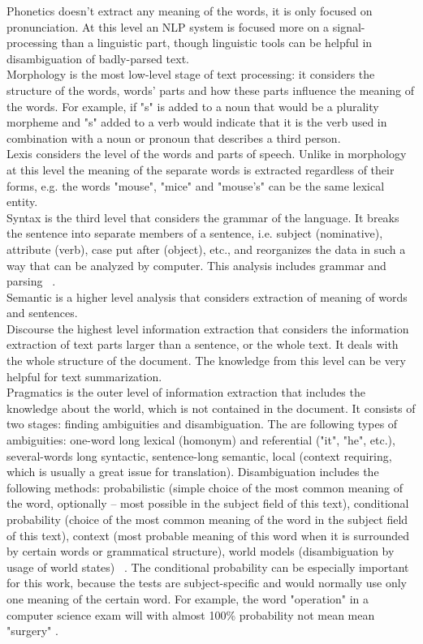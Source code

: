 \documentclass[11pt]{report}
\numberwithin{equation}{section} %
\begin{document}
Phonetics doesn't extract any meaning of the words, it is only focused on pronunciation. At this level an NLP system is focused more on a signal-processing than a linguistic part, though linguistic tools can be helpful in disambiguation of badly-parsed text.\\

Morphology is the most low-level stage of text processing: it considers the structure of the words, words' parts and how these parts influence the meaning of the words. For example, if "s" is added to a noun that would be a plurality morpheme and "s" added to a verb would indicate that it is the verb used in combination with a noun or pronoun that describes a third person.\\

Lexis considers the level of the words and parts of speech. Unlike in morphology at this level the meaning of the separate words is extracted regardless of their forms, e.g. the words "mouse", "mice" and "mouse's" can be the same lexical entity.\\

Syntax is the third level that considers the grammar of the language. It breaks the sentence into separate members of a sentence, i.e. subject (nominative), attribute (verb), case put after (object), etc., and reorganizes the data in such a way that can be analyzed by computer. This analysis includes grammar and parsing ~\cite{Saad}.\\

Semantic is a higher level analysis that considers extraction of meaning of words and sentences. \\

Discourse the highest level information extraction that considers the information extraction of text parts larger than a sentence, or the whole text. It deals with the whole structure of the document. The knowledge from this level can be very helpful for text summarization. \\

Pragmatics is the outer level of information extraction that includes the knowledge about the world, which is not contained in the document. It consists of two stages: finding ambiguities and disambiguation. The are following types of ambiguities: one-word long lexical (homonym) and referential ("it", "he", etc.), several-words long syntactic, sentence-long semantic, local (context requiring, which is usually a great issue for translation). Disambiguation includes the following methods: probabilistic (simple choice of the most common meaning of the word, optionally -- most possible in the subject field of this text), conditional probability (choice of the most common meaning of the word in the subject field of this text), context (most probable meaning of this word when it is surrounded by certain words or grammatical structure), world models (disambiguation by usage of world states)  ~\cite{Saad}. The conditional probability can be especially important for this work, because the tests are subject-specific and would normally use only one meaning of the certain word. For example, the word "operation" in a computer science exam will with almost 100\% probability not mean mean "surgery" . \\
\end{document}
